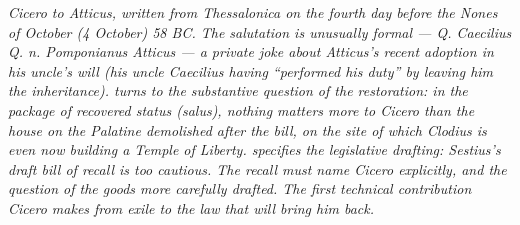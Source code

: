 
\textit{Cicero to Atticus, written from Thessalonica on the
fourth day before the Nones of October (4 October) 58 BC. The
salutation is unusually formal --- Q. Caecilius Q. n.
Pomponianus Atticus --- a private joke about Atticus's recent
adoption in his uncle's will (his uncle Caecilius having
``performed his duty'' by leaving him the inheritance).
 turns to the substantive question of the
restoration: in the package of recovered status (\textit{salus}),
nothing matters more to Cicero than the house on the Palatine
demolished after the bill, on the site of which Clodius is
even now building a Temple of Liberty. 
specifies the legislative drafting: Sestius's draft bill of
recall is too cautious. The recall must name Cicero
explicitly, and the question of the goods more
carefully drafted. The first technical contribution Cicero
makes from exile to the law that will bring him back.}
